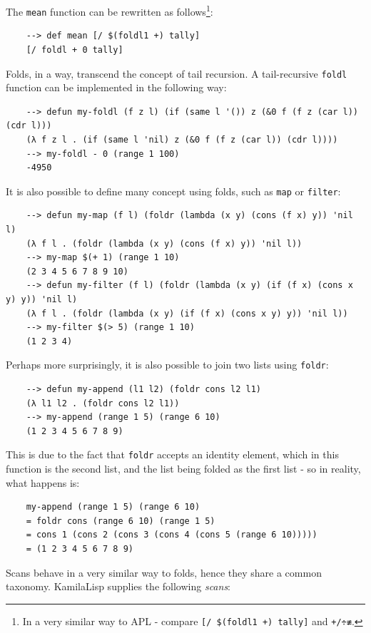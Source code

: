 The \verb|mean| function can be rewritten as follows\footnote{In a very similar way to APL - compare \verb|[/ $(foldl1 +) tally]| and \verb|+/÷≢|.}:

\begin{Verbatim}
    --> def mean [/ $(foldl1 +) tally]
    [/ foldl + 0 tally]
\end{Verbatim}

Folds, in a way, transcend the concept of tail recursion. A tail-recursive \verb|foldl| function can be implemented in the following way:

\begin{Verbatim}
    --> defun my-foldl (f z l) (if (same l '()) z (&0 f (f z (car l)) (cdr l)))
    (λ f z l . (if (same l 'nil) z (&0 f (f z (car l)) (cdr l))))
    --> my-foldl - 0 (range 1 100)
    -4950
\end{Verbatim}

It is also possible to define many concept using folds, such as \verb|map| or \verb|filter|:

\begin{Verbatim}
    --> defun my-map (f l) (foldr (lambda (x y) (cons (f x) y)) 'nil l)
    (λ f l . (foldr (lambda (x y) (cons (f x) y)) 'nil l))
    --> my-map $(+ 1) (range 1 10)
    (2 3 4 5 6 7 8 9 10)
    --> defun my-filter (f l) (foldr (lambda (x y) (if (f x) (cons x y) y)) 'nil l)
    (λ f l . (foldr (lambda (x y) (if (f x) (cons x y) y)) 'nil l))
    --> my-filter $(> 5) (range 1 10)
    (1 2 3 4)
\end{Verbatim}

Perhaps more surprisingly, it is also possible to join two lists using \verb|foldr|:

\begin{Verbatim}
    --> defun my-append (l1 l2) (foldr cons l2 l1)
    (λ l1 l2 . (foldr cons l2 l1))
    --> my-append (range 1 5) (range 6 10)
    (1 2 3 4 5 6 7 8 9)
\end{Verbatim}

This is due to the fact that \verb|foldr| accepts an identity element, which in this function is the second list, and the list being folded as the first list - so in reality, what happens is:

\begin{Verbatim}
    my-append (range 1 5) (range 6 10)
    = foldr cons (range 6 10) (range 1 5)
    = cons 1 (cons 2 (cons 3 (cons 4 (cons 5 (range 6 10)))))
    = (1 2 3 4 5 6 7 8 9)
\end{Verbatim}

Scans behave in a very similar way to folds, hence they share a common taxonomy. KamilaLisp supplies the following \textit{scans}:

